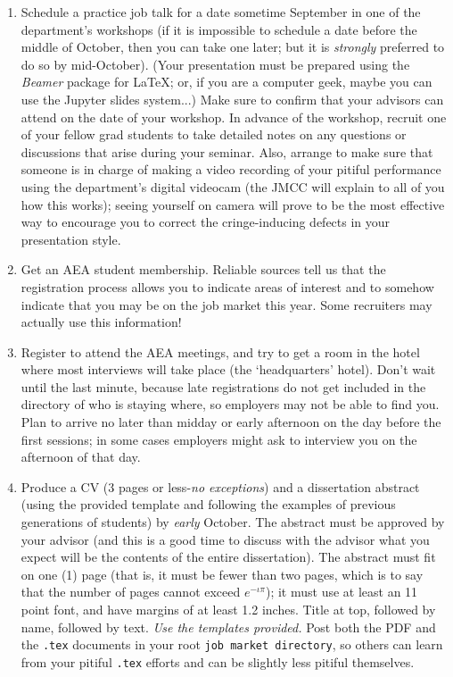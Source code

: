 \documentclass{\classes/econtex}
\begin{document}
\begin{enumerate}
  \hypertarget{Schedule-Job-Talk}{}
\item Schedule a practice job talk for a date sometime September in one of the department's workshops (if it is impossible to schedule a date before the middle of October, then you can take one later; but it is \textit{strongly} preferred to do so by mid-October).  (Your presentation must be prepared using the \textit{Beamer} package for {\LaTeX}; or, if you are a computer geek, maybe you can use the Jupyter slides system...)  Make sure to confirm that your advisors can attend on the date of your workshop.  In advance of the workshop, recruit one of your fellow grad students to take detailed notes on any questions or discussions that arise during your seminar.  Also, arrange to make sure that someone is in charge of making a video recording of your pitiful performance using the department's digital videocam (the JMCC will explain to all of you how this works); seeing yourself on camera will prove to be the most effective way to encourage you to correct the cringe-inducing defects in your presentation style.
  
  \hypertarget{Get-AEA-Membership}{}
\item Get an AEA student membership.  Reliable sources tell us that
  the registration process allows you to indicate areas of interest
  and to somehow indicate that you may be on the job market this year.
  Some recruiters may actually use this information!
  
  \hypertarget{Register-For-AEA}{}
\item Register to attend the AEA meetings, and try to get a room in
  the hotel where most interviews will take place (the `headquarters'
  hotel).  Don't wait until the last minute, because late
  registrations do not get included in the directory of who is staying
  where, so employers may not be able to find you.  Plan to arrive no
  later than midday or early afternoon on the day before the first
  sessions; in some cases employers might ask to interview you on the
  afternoon of that day.
  
  \hypertarget{CV}{}
\item Produce a CV (3 pages or less-\textit{no exceptions}) and a
  dissertation abstract (using the provided template and following the
  examples of previous generations of students) by \textit{early} October.  The
  abstract must be approved by your advisor (and this is a good time
  to discuss with the advisor what you expect will be the contents of
  the entire dissertation).  The abstract must fit on one (1) page
  (that is, it must be fewer than two pages, which is to say that the
  number of pages cannot exceed $e^{-\iota \pi}$); it must use at
  least an 11 point font, and have margins of at least 1.2 inches.  Title at
  top, followed by name, followed by text. \textit{Use the templates
    provided.}  Post both the PDF and the \texttt{.tex} documents in
  your root \texttt{job market directory}, so others can learn from your pitiful
  \texttt{.tex} efforts and can be slightly less pitiful themselves.


\end{enumerate}
\end{document}
